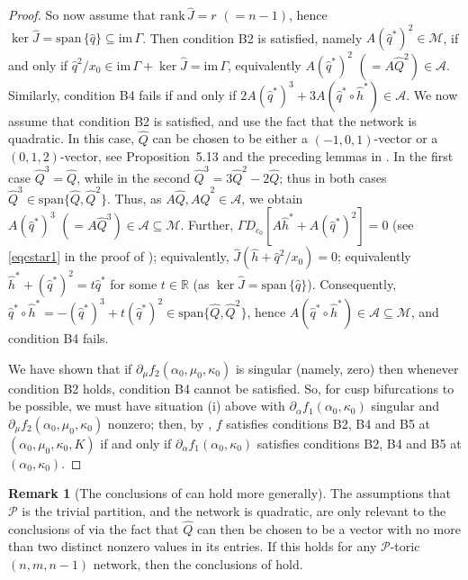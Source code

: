 \documentclass[11pt]{amsart}
\renewcommand{\k}{\kappa}
\newcommand{\R}{\mathbb{R}}
\newcommand{\wQ}{\widehat{Q}}
\newcommand{\wJ}{\hat{J}}
\newcommand{\mA}{\mathcal{A}}
\newcommand{\mP}{\mathcal{P}}
\newcommand{\mM}{\mathcal{M}}
\theoremstyle{definition}
\newtheorem{remark}[theorem]{Remark}
\begin{document}
\begin{proof}
So now assume that $\mathrm{rank}\,\wJ = r\,\, (= n-1)$, hence $\ker \wJ = \mathrm{span}\,\{\hat{q}\} \subseteq \mathrm{im}\,\Gamma$. Then condition B2 is satisfied, namely $A(\hat{q}^*)^2 \in \mM$, if and only if $\hat{q}^2/x_0 \in \mathrm{im}\,\Gamma + \ker \wJ = \mathrm{im}\,\Gamma$, equivalently $A(\hat{q}^*)^2\,\, (=A\wQ^2) \in \mA$. Similarly, condition B4 fails if and only if $2A(\hat{q}^*)^3 + 3A(\hat{q}^*\circ \hat{h}^*) \in \mA$. We now assume that condition B2 is satisfied, and use the fact that the network is quadratic. In this case, $\wQ$ can be chosen to be either a $(-1,0,1)$-vector or a $(0,1,2)$-vector, see Proposition~5.13 and the preceding lemmas in \cite{banajifeliu26}. In the first case $\wQ^3 = \wQ$, while in the second $\wQ^3 = 3\wQ^2-2\wQ$; thus in both cases $\wQ^3 \in \mathrm{span}\{\wQ, \wQ^2\}$. Thus, as $A\wQ, A\wQ^2 \in \mA$, we obtain $A(\hat{q}^*)^3 \,\,(= A\wQ^3) \in \mA \subseteq \mM$. Further, $\Gamma D_{c_0}[A \hat{h}^* + A(\hat{q}^*)^2]=0$ (see \eqref{eqcstar1} in the proof of ); equivalently, $\wJ(\hat{h} + \hat{q}^2/x_0) = 0$; equivalently $\hat{h}^* + (\hat{q}^*)^2 = t\hat{q}^*$ for some $t \in \R$ (as $\ker \wJ = \mathrm{span}\,\{\hat{q}\}$). Consequently, $\hat{q}^* \circ \hat{h}^*  = -(\hat{q}^*)^3 + t(\hat{q}^*)^2 \in \mathrm{span}\{\wQ, \wQ^2\}$, hence $A(\hat{q}^* \circ \hat{h}^*) \in \mA \subseteq \mM$, and condition B4 fails. 

We have shown that if $\partial_\mu f_2(\alpha_0, \mu_0, \k_0)$ is singular (namely, zero) then whenever condition B2 holds, condition B4 cannot be satisfied. So, for cusp bifurcations to be possible, we must have situation (i) above with $\partial_\alpha f_1(\alpha_0, \k_0)$ singular and $\partial_{\mu} f_2(\alpha_0, \mu_0, \k_0)$ nonzero; then, by , $f$ satisfies conditions B2, B4 and B5 at $(\alpha_0, \mu_0, \k_0, K)$ if and only if $\partial_\alpha f_1(\alpha_0, \k_0)$ satisfies conditions B2, B4 and B5 at $(\alpha_0, \k_0)$.  
\end{proof}

\begin{remark}[The conclusions of  can hold more generally]
The assumptions that $\mP$ is the trivial partition, and the network is quadratic, are only relevant to the conclusions of  via the fact that $\wQ$ can then be chosen to be a vector with no more than two distinct nonzero values in its entries. If this holds for any $\mP$-toric $(n,m,n-1)$ network, then the conclusions of  hold. 
\end{remark}
\end{document}
